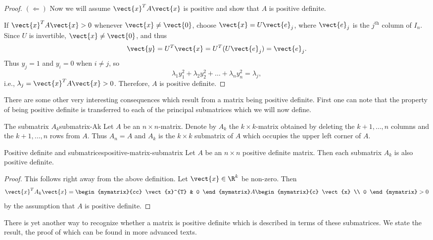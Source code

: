 \begin{proof}
$(\Leftarrow)$ Now we will assume $\vect{x}^T A \vect{x} $ is positive and show that $A$ is positive definite.

If $\vect{x}^TA\vect{x}>0$ whenever $\vect{x}\neq \vect{0}$,
choose $\vect{x}=U\vect{e}_j$, where $\vect{e}_j$ is the $j^{\mbox{th}}$
column of $I_n$.
Since $U$ is invertible, $\vect{x}\neq\vect{0}$, 
and thus
\[ \vect{y}=U^T\vect{x}=U^T(U\vect{e}_j) =\vect{e}_j.\]
Thus $y_j=1$ and $y_i=0$ when $i\neq j$, so
\[ \lambda_1 y_1^2 + \lambda_2 y_2^2 + \ldots + \lambda_n y_n^2
=\lambda_j,\]
i.e., $\lambda_j=\vect{x}^TA\vect{x}>0$.
Therefore, $A$ is positive definite.
\end{proof}

There are some other very interesting consequences which result from a
matrix being positive definite. First one can note that the property of
being positive definite is transferred to each of the principal submatrices which we will now define.

\begin{definition}{The submatrix $A_k$}{submatrix-Ak}
Let $A$ be an $n\times n$-matrix. Denote by $A_{k}$ the $k\times k$-matrix
obtained by deleting the $k+1,\ldots,n$ columns and the $k+1,\ldots,n$
rows from $A$. Thus $A_{n}=A$ and $A_{k}$ is the $k\times k$ submatrix of $A$
which occupies the upper left corner of $A$.
\end{definition}

\begin{lemma}{Positive definite and submatrices}{positive-matrix-submatrix}
Let $A$ be an $n\times n$ positive definite matrix.  Then each submatrix $A_{k}$ is also positive definite.
\end{lemma}

\begin{proof}
This follows right away from the above definition. Let $\vect{x}\in \R^{k}$ be non-zero. Then 
\begin{equation*}
\vect{x}^{T}A_{k}\vect{x}=\begin{mymatrix}{cc}
\vect{x}^{T} & 0
\end{mymatrix} A\begin{mymatrix}{c}
\vect{x} \\ 
0
\end{mymatrix} >  0
\end{equation*}
by the assumption that $A$ is positive definite.
\end{proof}

There is yet another way to recognize whether a matrix is positive definite
which is described in terms of these submatrices. We state the result,  the proof
of which can be found in more advanced texts.


